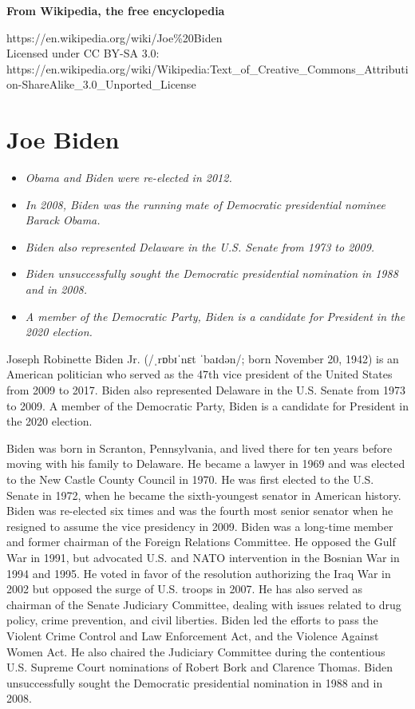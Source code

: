 \textbf{From Wikipedia, the free encyclopedia}

https://en.wikipedia.org/wiki/Joe\%20Biden\\
Licensed under CC BY-SA 3.0:\\
https://en.wikipedia.org/wiki/Wikipedia:Text\_of\_Creative\_Commons\_Attribution-ShareAlike\_3.0\_Unported\_License

\section{Joe Biden}\label{joe-biden}

\begin{itemize}
\item
  \emph{Obama and Biden were re-elected in 2012.}
\item
  \emph{In 2008, Biden was the running mate of Democratic presidential
  nominee Barack Obama.}
\item
  \emph{Biden also represented Delaware in the U.S. Senate from 1973 to
  2009.}
\item
  \emph{Biden unsuccessfully sought the Democratic presidential
  nomination in 1988 and in 2008.}
\item
  \emph{A member of the Democratic Party, Biden is a candidate for
  President in the 2020 election.}
\end{itemize}

Joseph Robinette Biden Jr. (/ˌrɒbɪˈnɛt ˈbaɪdən/; born November 20, 1942)
is an American politician who served as the 47th vice president of the
United States from 2009 to 2017. Biden also represented Delaware in the
U.S. Senate from 1973 to 2009. A member of the Democratic Party, Biden
is a candidate for President in the 2020 election.

Biden was born in Scranton, Pennsylvania, and lived there for ten years
before moving with his family to Delaware. He became a lawyer in 1969
and was elected to the New Castle County Council in 1970. He was first
elected to the U.S. Senate in 1972, when he became the sixth-youngest
senator in American history. Biden was re-elected six times and was the
fourth most senior senator when he resigned to assume the vice
presidency in 2009. Biden was a long-time member and former chairman of
the Foreign Relations Committee. He opposed the Gulf War in 1991, but
advocated U.S. and NATO intervention in the Bosnian War in 1994 and
1995. He voted in favor of the resolution authorizing the Iraq War in
2002 but opposed the surge of U.S. troops in 2007. He has also served as
chairman of the Senate Judiciary Committee, dealing with issues related
to drug policy, crime prevention, and civil liberties. Biden led the
efforts to pass the Violent Crime Control and Law Enforcement Act, and
the Violence Against Women Act. He also chaired the Judiciary Committee
during the contentious U.S. Supreme Court nominations of Robert Bork and
Clarence Thomas. Biden unsuccessfully sought the Democratic presidential
nomination in 1988 and in 2008.

